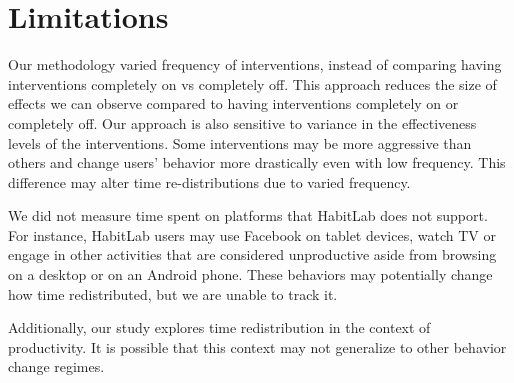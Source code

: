 \section{Limitations}

Our methodology varied frequency of interventions, instead of comparing having interventions completely on vs completely off. This approach reduces the size of effects we can observe compared to having interventions completely on or completely off. Our approach is also sensitive to variance in the effectiveness levels of the interventions. Some interventions may be more aggressive than others and change users' behavior more drastically even with low frequency. This difference may alter time re-distributions due to varied frequency. %

We did not measure time spent on platforms that HabitLab does not support. For instance, HabitLab users may use Facebook on tablet devices, watch TV or engage in other activities that are considered unproductive aside from browsing on a desktop or on an Android phone. These behaviors may potentially change how time redistributed, but we are unable to track it. 

Additionally, our study explores time redistribution in the context of productivity. It is possible that this context may not generalize to other behavior change regimes.



